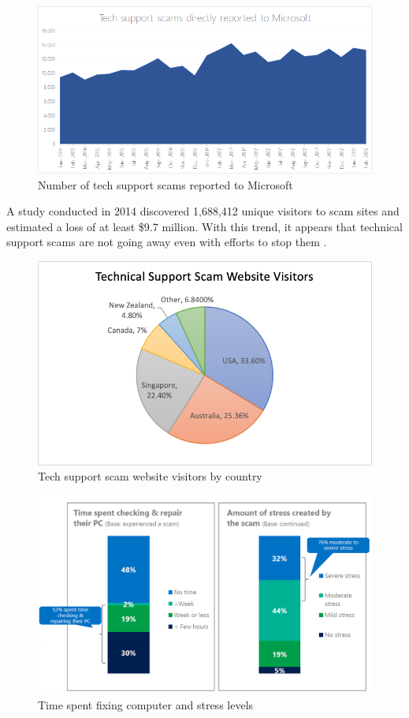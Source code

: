 \documentclass[final]{IEEEtran}
\begin{document}
\begin{figure}[htbp]
\centerline{\includegraphics[keepaspectratio=true, scale = 0.32]{image1.png}}
\caption{Number of tech support scams reported to Microsoft}
\label{fig2}
\end{figure}

A study \cite{b2} conducted in 2014 discovered 1,688,412 unique visitors to scam sites and estimated a loss of at least \$9.7 million. With this trend, it appears that technical support scams are not going away even with efforts to stop them \cite[p. 8]{b2}.

\begin{figure}[htbp]
\centerline{\includegraphics[keepaspectratio=true, scale = 0.30]{image0.png}}
\caption{Tech support scam website visitors by country}
\label{fig1}
\end{figure}

\begin{figure}[htbp]
\centerline{\includegraphics[keepaspectratio=true, scale = 0.25]{timeandstress.png}}
\caption{Time spent fixing computer and stress levels}
\label{fig3}
\end{figure}
\end{document}
